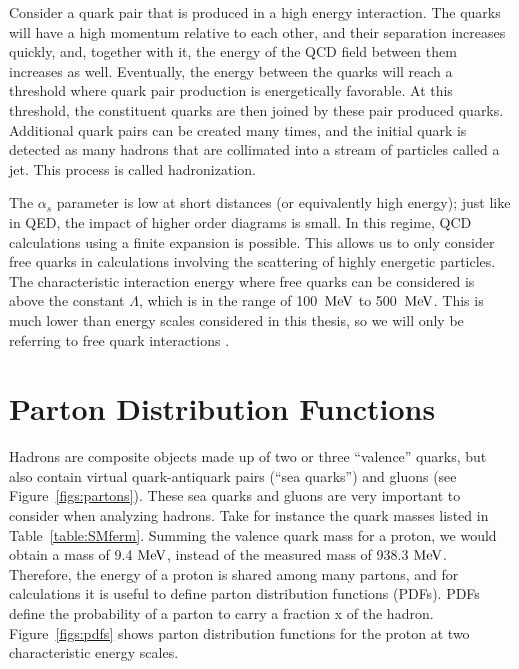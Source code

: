 Consider a quark pair that is produced in a high energy interaction.  The quarks will have a high momentum relative to each other, 
and their separation increases quickly, and, together with it, the energy of the QCD field between them increases as well.  
Eventually, the energy between the quarks will reach a threshold where quark pair production is energetically favorable.  
At this threshold, the constituent quarks are then joined by these pair produced quarks.  
Additional quark pairs can be created many times, and the initial quark is detected as many hadrons that are collimated into a stream of particles called a jet.  
This process is called hadronization.  

The $\alpha_s$ parameter is low at short distances (or equivalently high energy); 
just like in QED, the impact of higher order diagrams is small.  
In this regime, QCD calculations using a finite expansion is possible.  This allows us to only consider free quarks in calculations involving the scattering of highly energetic particles. 
The characteristic interaction energy where free quarks can be considered is above the constant $\Lambda$, which is in the range of 100~$\mathrm{MeV}$ to 500~$\mathrm{MeV}$.
This is much lower than energy scales considered in this thesis, so we will only be referring to free quark interactions \cite{Griffiths}.  


\section{Parton Distribution Functions}
\label{sec:pdftheory}
Hadrons are composite objects made up of two or three ``valence'' quarks, but also contain virtual quark-antiquark pairs (``sea quarks'') and gluons (see Figure~\ref{figs:partons}).  
These sea quarks and gluons are very important to consider when analyzing hadrons.  
Take for instance the quark masses listed in Table~\ref{table:SMferm}.  
Summing the valence quark mass for a proton, we would obtain a mass of 9.4$~\mathrm{MeV}$, instead of the measured mass of 938.3$~\mathrm{MeV}$.  
Therefore, the energy of a proton is shared among many  partons, and for calculations it is useful to define parton distribution functions (PDFs). 
PDFs define the probability of a parton to carry a fraction x of the hadron.  
Figure~\ref{figs:pdfs} shows parton distribution functions for the proton at two characteristic energy scales.  


